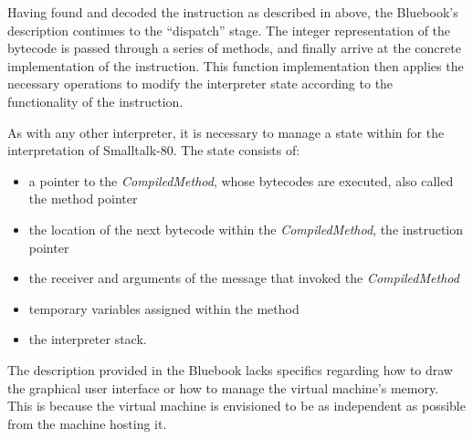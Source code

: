 Having found and decoded the instruction as described in above, the Bluebook's description continues to the \enquote{dispatch} stage. The integer representation of the bytecode is passed through a series of methods, and finally arrive at the concrete implementation of the instruction. This function implementation then applies the necessary operations to modify the interpreter state according to the functionality of the instruction.

As with any other interpreter, it is necessary to manage a state within for the interpretation of Smalltalk-80.
The state consists of:
\begin{itemize}
  \item a pointer to the \emph{CompiledMethod}, whose bytecodes are executed, also called the method pointer
  \item the location of the next bytecode within the \emph{CompiledMethod}, the instruction pointer 
  \item the receiver and arguments of the message that invoked the \emph{CompiledMethod}
  \item temporary variables assigned within the method 
  \item the interpreter stack.
\end{itemize}

The description provided in the Bluebook lacks specifics regarding how to draw the graphical user interface or how to manage the virtual machine's memory. This is because the virtual machine is envisioned to be as independent as possible from the machine hosting it.
